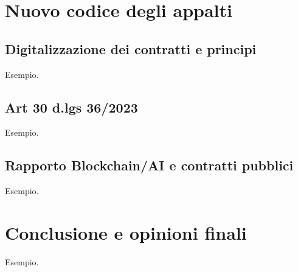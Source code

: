 \documentclass{article}
\begin{document}
\newpage\centering
\section{Nuovo codice degli appalti}
\flushleft
\begin{justify}
    
\end{justify}

\flushleft \subsection{Digitalizzazione dei contratti e principi}
Esempio.
\flushleft \subsection{Art 30 d.lgs 36/2023}
Esempio.
\flushleft \subsection{Rapporto Blockchain/AI e contratti pubblici}
Esempio.

\newpage \centering
\section{Conclusione e opinioni finali}
\flushleft Esempio.
\end{document}
